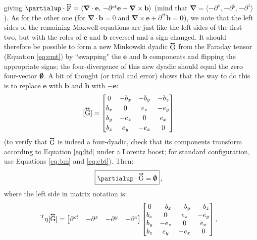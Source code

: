 \documentclass[12pt]{article}
\renewcommand{\vv}[1]{\mathbf{#1}}
\newcommand{\del}{\boldsymbol{\nabla}}
\newcommand{\tightoverset}[2]{%
  \mathop{#2}\limits^{\vbox to -.5ex{\kern-0.75ex\hbox{$#1$}\vss}}}
\newcommand{\inlinedy}[1]{\tightoverset{\text{\tiny$\bm\leftrightarrow$}}{#1}}
\newcommand{\capdy}[1]{ \overset{ \text{\tiny$\bm\leftrightarrow$} }{\vphantom{\text{\small{A}}}\smash{#1}} }
\begin{document}
giving $\partialup \cdot \inlinedy{\mathrm{F}} = \langle \del \cdot \vv e , \, - \partial^{ct} \vv e + \del \times \vv b \rangle$ (mind that $\del = \langle - \partial^x , - \partial^y , - \partial^z \rangle$). As for the other one (for $\del \cdot \vv b = 0$ and $\del \times \vv e + \partial^{ct} \vv b = \vv 0$), we note that the left sides of the remaining Maxwell equations are just like the left sides of the first two, but with the roles of $\vv e$ and $\vv b$ reversed and a sign changed. It should therefore be possible to form a new Minkowski dyadic $\inlinedy{\mathrm{G}}$ from the Faraday tensor (Equation \ref{eq:emt}) by ``swapping" the $\vv e$ and $\vv b$ components and flipping the appropriate signs; the four-divergence of this new dyadic should equal the zero four-vector $\textrm{\mbox{\boldmath $\emptyset$}}$. A bit of thought (or trial and error) shows that the way to do this is to replace $\vv e$ with $\vv b$ and $\vv b$ with $- \vv e$:
\begin{equation}\label{eq:mt}
[ \capdy{\mathrm{G}} ]
=
\begin{bmatrix}
0 & -b_x & -b_y & -b_z \\[.5ex]
b_x & 0 & e_z & -e_y \\[.5ex]
b_y & -e_z & 0 & e_x \\[.5ex]
b_z & e_y & -e_x & 0
\end{bmatrix}
\end{equation}
(to verify that $\inlinedy{\mathrm{G}}$ is indeed a four-dyadic, check that its components transform according to Equation \ref{eq:ltd} under a Lorentz boost; for standard configuration, use Equations \ref{eq:bm} and \ref{eq:ebt}). Then:
\begin{equation}\label{eq:hme}
\boxed{ \vphantom{A_{A_A}} \partialup \cdot \capdy{\mathrm{G}} = \textrm{\mbox{\boldmath $\emptyset$}} } \, ,
\end{equation}
where the left side in matrix notation is:
\begin{equation*}
[\partialup]^{\mathrm{T}} \eta [\capdy{\mathrm{G}}]
=
\begin{bmatrix}
\partial^{ct} & - \partial^x & - \partial^y & - \partial^z
\end{bmatrix}
\begin{bmatrix}
0 & -b_x & -b_y & -b_z \\
b_x & 0 & e_z & -e_y \\
b_y & -e_z & 0 & e_x \\
b_z & e_y & -e_x & 0
\end{bmatrix} ,
\end{equation*}
\end{document}
